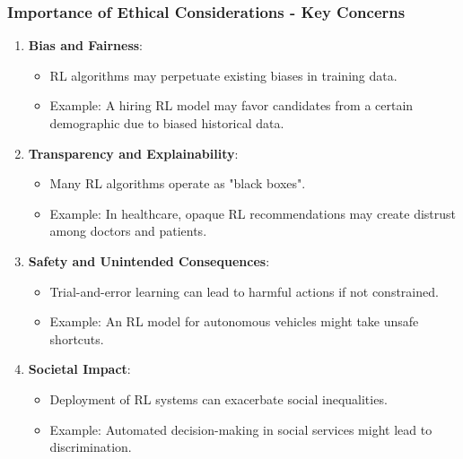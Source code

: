 \documentclass[aspectratio=169]{beamer}
\begin{document}
\begin{frame}[fragile]
    \frametitle{Importance of Ethical Considerations - Key Concerns}
    \begin{enumerate}
        \item \textbf{Bias and Fairness}:
        \begin{itemize}
            \item RL algorithms may perpetuate existing biases in training data.
            \item Example: A hiring RL model may favor candidates from a certain demographic due to biased historical data.
        \end{itemize}
        
        \item \textbf{Transparency and Explainability}:
        \begin{itemize}
            \item Many RL algorithms operate as "black boxes".
            \item Example: In healthcare, opaque RL recommendations may create distrust among doctors and patients.
        \end{itemize}
        
        \item \textbf{Safety and Unintended Consequences}:
        \begin{itemize}
            \item Trial-and-error learning can lead to harmful actions if not constrained.
            \item Example: An RL model for autonomous vehicles might take unsafe shortcuts.
        \end{itemize}
        
        \item \textbf{Societal Impact}:
        \begin{itemize}
            \item Deployment of RL systems can exacerbate social inequalities.
            \item Example: Automated decision-making in social services might lead to discrimination.
        \end{itemize}
    \end{enumerate}
\end{frame}
\end{document}
